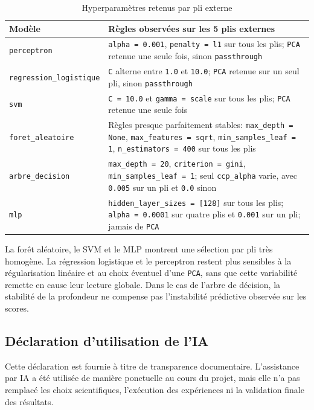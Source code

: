 \begin{table}[H]
\centering
\begin{tabular}{|l|>{\raggedright\arraybackslash}p{10.5cm}|}
\hline
\textbf{Modèle} & \textbf{Règles observées sur les 5 plis externes} \\
\hline
\texttt{perceptron} & \texttt{alpha = 0.001}, \texttt{penalty = l1} sur tous les plis; \texttt{PCA} retenue une seule fois, sinon \texttt{passthrough} \\
\hline
\texttt{regression\_logistique} & \texttt{C} alterne entre \texttt{1.0} et \texttt{10.0}; \texttt{PCA} retenue sur un seul pli, sinon \texttt{passthrough} \\
\hline
\texttt{svm} & \texttt{C = 10.0} et \texttt{gamma = scale} sur tous les plis; \texttt{PCA} retenue une seule fois \\
\hline
\texttt{foret\_aleatoire} & Règles presque parfaitement stables: \texttt{max\_depth = None}, \texttt{max\_features = sqrt}, \texttt{min\_samples\_leaf = 1}, \texttt{n\_estimators = 400} sur tous les plis \\
\hline
\texttt{arbre\_decision} & \texttt{max\_depth = 20}, \texttt{criterion = gini}, \texttt{min\_samples\_leaf = 1}; seul \texttt{ccp\_alpha} varie, avec \texttt{0.005} sur un pli et \texttt{0.0} sinon \\
\hline
\texttt{mlp} & \texttt{hidden\_layer\_sizes = [128]} sur tous les plis; \texttt{alpha = 0.0001} sur quatre plis et \texttt{0.001} sur un pli; jamais de \texttt{PCA} \\
\hline
\end{tabular}
\caption{Hyperparamètres retenus par pli externe}
\end{table}

La forêt aléatoire, le SVM et le MLP montrent une sélection par pli très homogène. La régression logistique et le perceptron restent plus sensibles à la régularisation linéaire et au choix éventuel d'une \texttt{PCA}, sans que cette variabilité remette en cause leur lecture globale. Dans le cas de l'arbre de décision, la stabilité de la profondeur ne compense pas l'instabilité prédictive observée sur les scores.

\subsection{Déclaration d'utilisation de l'IA}
Cette déclaration est fournie à titre de transparence documentaire. L'assistance par IA a été utilisée de manière ponctuelle au cours du projet, mais elle n'a pas remplacé les choix scientifiques, l'exécution des expériences ni la validation finale des résultats.

